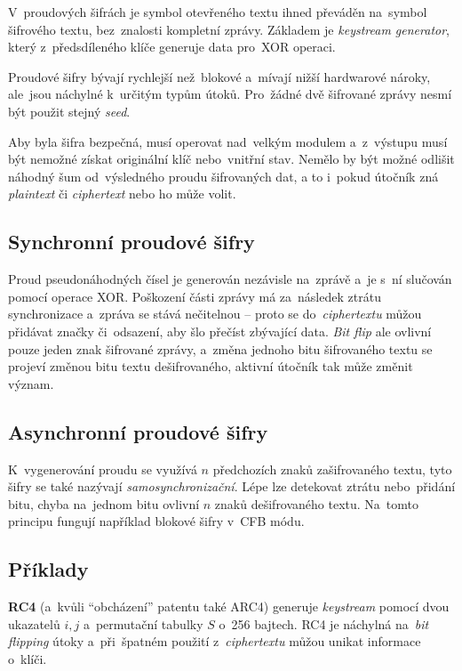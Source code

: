 V~proudových šifrách je symbol otevřeného textu ihned převáděn na~symbol šifrového textu, bez~znalosti kompletní zprávy. Základem je \emph{keystream generator}, který z~předsdíleného klíče generuje data pro~XOR operaci.

Proudové šifry bývají rychlejší než~blokové a~mívají nižší hardwarové nároky, ale~jsou náchylné k~určitým typům útoků. Pro~žádné dvě šifrované zprávy nesmí být použit stejný \emph{seed}.

Aby byla šifra bezpečná, musí operovat nad~velkým modulem a~z~výstupu musí být nemožné získat originální klíč nebo~vnitřní stav. Nemělo by být možné odlišit náhodný šum od~výsledného proudu šifrovaných dat, a to i~pokud útočník zná \emph{plaintext} či \emph{ciphertext} nebo ho může volit.

\subsection{Synchronní proudové šifry}

Proud pseudonáhodných čísel je generován nezávisle na~zprávě a~je s~ní slučován pomocí operace XOR. Poškození části zprávy má za~následek ztrátu synchronizace a~zpráva se stává nečitelnou -- proto se do~\emph{ciphertextu} můžou přidávat značky či~odsazení, aby šlo přečíst zbývající data. \emph{Bit flip} ale ovlivní pouze jeden znak šifrované zprávy, a~změna jednoho bitu šifrovaného textu se projeví změnou bitu textu dešifrovaného, aktivní útočník tak může změnit význam.

\subsection{Asynchronní proudové šifry}

K~vygenerování proudu se využívá $n$ předchozích znaků zašifrovaného textu, tyto šifry se také nazývají \emph{samosynchronizační}. Lépe lze detekovat ztrátu nebo~přidání bitu, chyba na~jednom bitu ovlivní $n$ znaků dešifrovaného textu. Na~tomto principu fungují například blokové šifry v~CFB módu.

\subsection{Příklady}

\textbf{RC4} (a~kvůli \enquote{obcházení} patentu také ARC4) generuje \emph{keystream} pomocí dvou ukazatelů $i, j$ a~permutační tabulky $S$ o~256 bajtech. RC4 je náchylná na~\emph{bit flipping} útoky a~při~špatném použití z~\emph{ciphertextu} můžou unikat informace o~klíči.

